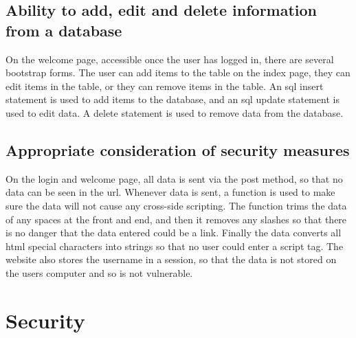 \documentclass[12pt,a4paper]{article}
\begin{document}
		\subsection{Ability to add, edit and delete information from a database}
		On the welcome page, accessible once the user has logged in, there are several bootstrap forms. The user can add items to the table on the index page, they can edit items in the table, or they can remove items in the table. An sql insert statement is used to add items to the database, and an sql update statement is used to edit data. A delete statement is used to remove data from the database.

		\subsection{Appropriate consideration of security measures}
		On the login and welcome page, all data is sent via the post method, so that no data can be seen in the url. Whenever data is sent, a function is used to make sure the data will not cause any cross-side scripting. The function trims the data of any spaces at the front and end, and then it removes any slashes so that there is no danger that the data entered could be a link. Finally the data converts all html special characters into strings so that no user could enter a script tag. The website also stores the username in a session, so that the data is not stored on the users computer and so is not vulnerable.

	\clearpage


	\section{Security}
\end{document}
